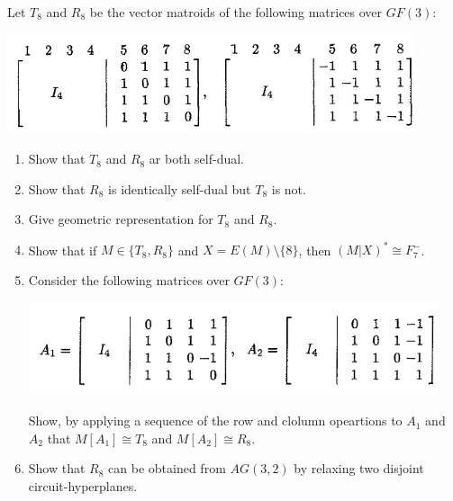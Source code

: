 \prob
{\label{t2:p7}
    Let $T_8$ and $R_8$ be the vector matroids of the following matrices over $GF(3)$:\pn
            \begin{center}
                \includegraphics[width=12cm]{Test2/Problem7/FirstMatrices.png}
            \end{center}\pn
    
    \begin{enumerate}[label=(\roman*)]
        \item Show that $T_8$ and $R_8$ ar both self-dual.
        \item Show that $R_8$ is identically self-dual but $T_8$ is not.
        \item Give geometric representation for $T_8$ and $R_8$.
        \item Show that if $M \in \{T_8, R_8\}$ and $X = E(M) \setminus \{8\}$, then
                $(M|X)^* \cong F_7^-$.
        \item Consider the following matrices over $GF(3)$:
            \begin{center}
                \includegraphics[width=12cm]{Test2/Problem7/SecondMatrices.png}
            \end{center}\pn
            Show, by applying a sequence of the row and clolumn opeartions to $A_1$ and $A_2$
            that $M[A_1] \cong T_8$ and $M[A_2] \cong R_8$.
        \item Show that $R_8$ can be obtained from $AG(3, 2)$ by relaxing two disjoint 
            circuit-hyperplanes.
    \end{enumerate}
}
